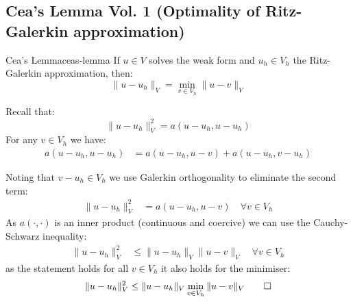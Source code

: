 \subsection{Cea's Lemma Vol. 1 (Optimality of Ritz-Galerkin approximation)}
\begin{lemma}{Cea's Lemma}{ceas-lemma}
    If $u \in V$ solves the weak form and $u_h \in V_h$ the Ritz-Galerkin approximation, then:
    \[
        \|u - u_h\|_V = \min_{v \in V_h} \|u - v\|_V
    \]
\end{lemma}

Recall that:
\[
    \|u - u_h\|_V^2 = a(u - u_h, u - u_h)
\]
For any $v \in V_h$ we have:
\begin{align*}
    a(u - u_h, u - u_h) & = a(u - u_h, u - v) + a(u - u_h, v - u_h)
\end{align*}

Noting that $v - u_h \in V_h$ we use Galerkin orthogonality to eliminate the second term:
\begin{align*}
    \|u - u_h\|_V^2 & = a(u - u_h, u - v) \quad \forall v \in V_h
\end{align*}
As $a(\cdot, \cdot)$ is an inner product (continuous and coercive) we can use the Cauchy-Schwarz inequality:
\begin{align*}
    \|u - u_h\|_V^2 & \leq \|u - u_h\|_V \|u - v\|_V \quad \forall v \in V_h
\end{align*}
as the statement holds for all $v \in V_h$ it also holds for the minimiser:
\[\|u - u_h\|_V^2 \leq \|u - u_h\|_V \min_{v \in V_h} \|u - v\|_V \qed\]

